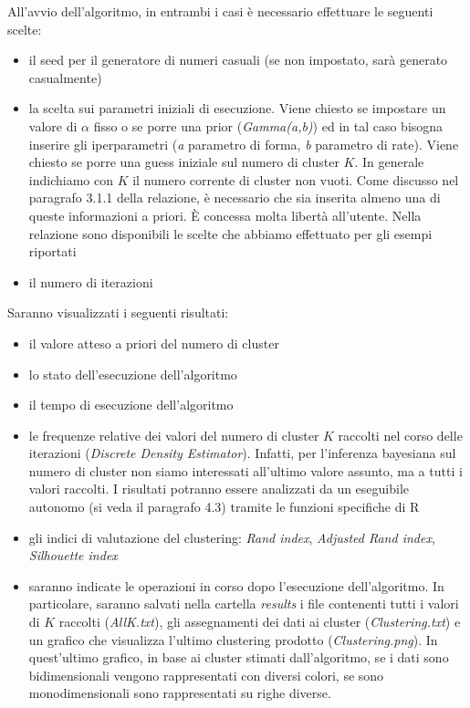 \documentclass[a4paper,12pt]{report}							%
\begin{document}
All'avvio dell'algoritmo, in entrambi i casi è necessario effettuare le seguenti scelte:
\begin{itemize}
 \item il seed per il generatore di numeri casuali (se non impostato, sarà generato casualmente)
 \item la scelta sui parametri iniziali di esecuzione. Viene chiesto se impostare un valore di $\alpha$ fisso o se porre 
 una prior (\textit{Gamma(a,b)}) ed in tal caso bisogna inserire gli iperparametri (\textit{a} parametro di forma, \textit{b} parametro di rate). 
 Viene chiesto se porre una guess iniziale sul numero di cluster $K$. In generale indichiamo con $K$ il numero corrente di cluster 
 non vuoti.
 Come discusso nel paragrafo 3.1.1 della relazione, è necessario
 che sia inserita almeno una di queste informazioni a priori. È concessa molta libertà all'utente. Nella relazione sono disponibili
 le scelte che abbiamo effettuato per gli esempi riportati
 \item il numero di iterazioni
\end{itemize}
Saranno visualizzati i seguenti risultati:
\begin{itemize}
 \item il valore atteso a priori del numero di cluster
 \item lo stato dell'esecuzione dell'algoritmo
 \item il tempo di esecuzione dell'algoritmo
 \item le frequenze relative dei valori del numero di cluster $K$ raccolti nel corso delle iterazioni (\textit{Discrete Density Estimator}). Infatti, per l'inferenza bayesiana sul numero di cluster
 non siamo interessati all'ultimo valore assunto, ma a tutti i valori raccolti. I risultati potranno essere analizzati da un eseguibile autonomo
 (si veda il  paragrafo 4.3) tramite le funzioni specifiche di R 
 \item gli indici di valutazione del clustering: \textit{Rand index}, \textit{Adjusted Rand index}, \textit{Silhouette index}
 \item saranno indicate le operazioni in corso dopo l'esecuzione dell'algoritmo. In particolare, saranno salvati nella 
 cartella \textit{results} i file contenenti tutti i valori di $K$ raccolti (\textit{AllK.txt}), gli assegnamenti dei dati 
 ai cluster (\textit{Clustering.txt}) e un grafico che visualizza l'ultimo clustering prodotto (\textit{Clustering.png}). 
 In quest'ultimo grafico, in base ai cluster stimati dall'algoritmo, se i dati sono bidimensionali
 vengono rappresentati con diversi colori, se sono monodimensionali sono rappresentati su righe diverse.
\end{itemize}
\end{document}
